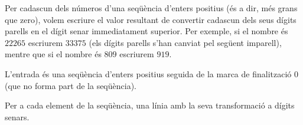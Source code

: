 
\Statement

Per cadascun dels números d'una seqüència d'enters positius (és a dir, més grans que zero), volem escriure el valor resultant de convertir cadascun dels seus dígits parells en el dígit senar immediatament superior. Per exemple, si el nombre és $22265$ escriurem $33375$ (els dígits parells s'han canviat pel següent imparell), mentre que si el nombre és $809$ escriurem $919$.

\Input

L'entrada és una seqüència d'enters positius seguida de la marca de finalització $0$ (que no forma part de la seqüència).

\Output

Per a cada element de la seqüència, una línia amb la seva transformació a dígits senars.

\Sample
